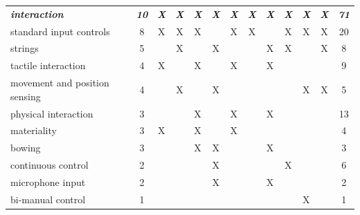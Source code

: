 \documentclass[letterpaper, 12pt]{article}
\begin{document}
\vspace{3ex}

\begin{spacing}{1.1}
    \footnotesize
    \begin{supertabular}{L{5.3cm}cccccccccccc}
        \emph{\textbf{interaction}} & \emph{\textbf{10}} & \emph{\textbf{X}} & \emph{\textbf{X}} & \emph{\textbf{X}} & \emph{\textbf{X}} & \emph{\textbf{X}} & \emph{\textbf{X}} & \emph{\textbf{X}} & \emph{\textbf{X}} & \emph{\textbf{X}} & \emph{\textbf{X}} & \emph{\textbf{71}} \\
        standard input controls          & 8  & X & X & X &   & X & X &   & X & X & X & 20 \\
        strings                          & 5  &   & X &   & X &   &   & X & X &   & X & 8  \\
        tactile interaction              & 4  & X &   & X &   & X &   & X &   &   &   & 9  \\
        movement and position sensing    & 4  &   & X &   & X &   &   &   &   & X & X & 5  \\
        physical interaction             & 3  &   &   & X &   & X &   & X &   &   &   & 13 \\
        materiality                      & 3  & X &   & X &   & X &   &   &   &   &   & 4  \\
        bowing                           & 3  &   &   & X & X &   &   & X &   &   &   & 3  \\
        continuous control               & 2  &   &   &   & X &   &   &   & X &   &   & 6  \\
        microphone input                 & 2  &   &   &   & X &   &   & X &   &   &   & 2  \\
        bi-manual control                & 1  &   &   &   &   &   &   &   &   & X &   & 1  \\
        \hline


\end{supertabular}
\end{spacing}
\end{document}
